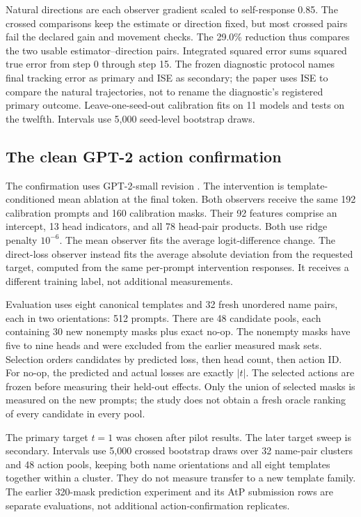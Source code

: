 Natural directions are each observer gradient scaled to self-response 0.85.
The crossed comparisons keep the estimate or direction fixed, but most crossed
pairs fail the declared gain and movement checks. The 29.0\% reduction thus
compares the two usable estimator--direction pairs. Integrated squared error
sums squared true error from step 0 through step 15. The frozen diagnostic
protocol names final tracking error as primary and ISE as secondary; the paper
uses ISE to compare the natural trajectories, not to rename the diagnostic's
registered primary outcome. Leave-one-seed-out calibration fits on 11 models
and tests on the twelfth. Intervals use 5,000 seed-level bootstrap draws.

\subsection{The clean GPT-2 action confirmation}

The confirmation uses GPT-2-small revision
.
The intervention is template-conditioned mean ablation at the final token.
Both observers receive the same 192 calibration prompts and 160 calibration
masks. Their 92 features comprise an intercept, 13 head indicators, and all
78 head-pair products. Both use ridge penalty $10^{-6}$. The mean observer
fits the average logit-difference change. The direct-loss observer instead
fits the average absolute deviation from the requested target, computed from
the same per-prompt intervention responses. It receives a different training
label, not additional measurements.

Evaluation uses eight canonical templates and 32 fresh unordered name pairs,
each in two orientations: 512 prompts. There are 48 candidate pools, each
containing 30 new nonempty masks plus exact no-op. The nonempty masks have
five to nine heads and were excluded from the earlier measured mask sets.
Selection orders candidates by predicted loss, then head count, then action
ID. For no-op, the predicted and actual losses are exactly $|t|$.
The selected actions are frozen before measuring their held-out effects.
Only the union of selected masks is measured on the new prompts; the study
does not obtain a fresh oracle ranking of every candidate in every pool.

The primary target $t=1$ was chosen after pilot results. The later target
sweep is secondary. Intervals use 5,000 crossed bootstrap draws over 32
name-pair clusters and 48 action pools, keeping both name orientations and
all eight templates together within a cluster. They do not measure transfer
to a new template family. The earlier 320-mask prediction experiment and its
AtP submission rows are separate evaluations, not additional action-confirmation
replicates.

